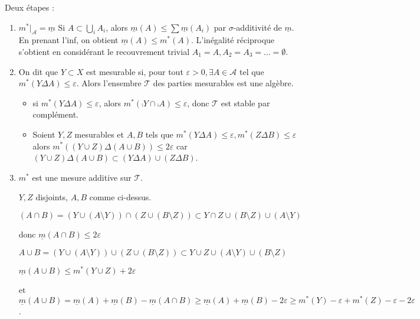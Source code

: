\documentclass[10pt,a4paper,notitlepage ]{report}
\begin{document}
\begin{demo}
	Deux étapes : \begin{enumerate}
		\item $m^*|_{\mathcal A} = \underline m$
		Si $A \subset \underset i \bigcup A_i$, alors $\underline m (A) \le \sum \underline m (A_i)$ par $\sigma$-additivité de $\underline m$. En prenant l'inf, on obtient $\underline m(A) \le m^*(A)$. L'inégalité réciproque s'obtient en considérant le recouvrement trivial $A_1 = A, A_2=A_3 = \dots = \emptyset$.
		\item On dit que $Y \subset X$ est mesurable si, pour tout $\varepsilon > 0, \exists A \in \mathcal A$ tel que $m^*(Y \Delta A) \le \varepsilon$. Alors l'ensembre $\mathcal T$ des parties mesurables est une algèbre.
		\begin{demo}
			\begin{itemize}
				\item si $m^*(Y \Delta A) \le \varepsilon$, alors $m^*(\comp Y \cap \comp A) \le \varepsilon$, donc $\mathcal T$ est stable par complément.
				\item Soient $Y, Z$ mesurables et $A, B$ tels que $m^*(Y \Delta A) \le \varepsilon, m^*(Z \Delta B) \le \varepsilon$ alors $m^*((Y \cup Z) \Delta (A \cup B)) \le 2\varepsilon$ car $(Y \cup Z)  \Delta (A \cup B) \subset (Y \Delta A) \cup (Z \Delta B)$.
			\end{itemize}
		\end{demo}
		\item $m^*$ est une mesure additive sur $\mathcal T$.
		\begin{demo}
			$Y, Z$ disjoints, $A,B$ comme ci-dessus. 
			
			$(A\cap B) = (Y \cup (A \setminus Y)) \cap (Z \cup (B \setminus Z)) \subset Y \cap Z \cup (B \setminus Z) \cup (A \setminus Y)$ 
			
			donc $\underline m (A \cap B) \le 2\varepsilon$
			
			$A \cup B = (Y \cup (A \setminus Y)) \cup (Z \cup (B \setminus Z)) \subset Y \cup Z \cup (A \setminus Y) \cup (B \setminus Z)$
			
			$\underline m (A \cup B) \le m^*(Y \cup Z) +2\varepsilon$
			
			et $\underline m (A \cup B) = \underline m(A) + \underline m(B) - \underline m(A \cap B) \ge \underline m(A) + \underline m(B) -2\varepsilon \ge m^*(Y) - \varepsilon + m^*(Z) - \varepsilon - 2\varepsilon$.
			

\end{demo}
\end{enumerate}
\end{demo}
\end{document}
